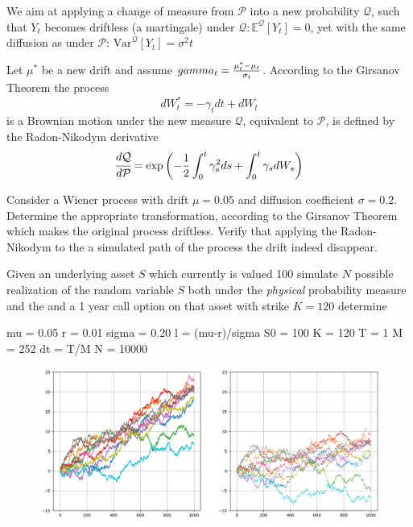 \documentclass[12pt,a4paper]{book}
\begin{document}
\begin{question}[subtitle=Drifty Brownian Motion]
We aim at applying a change of measure from $\mathcal{P}$ into a new probability $\mathcal{Q}$, such that $Y_t$ becomes driftless (a martingale) under $\mathcal{Q}: \mathbb{E}^{\mathcal{Q}}[Y_t]=0$, yet with the same diffusion as under $\mathcal{P}$: $\text{Var}^{\mathcal{Q}}[Y_t]=\sigma^2 t$

Let $\mu^{*}$ be a new drift and assume $\\gamma_t = \frac{\mu_t^{*}-\mu_t}{\sigma_t}$. According to the Girsanov Theorem the process
\begin{equation}
dW^{*}_t = -\gamma_t dt + dW_t
\end{equation}
is a Brownian motion under the new measure $\mathcal{Q}$, equivalent to $\mathcal{P}$, is defined by the Radon-Nikodym derivative
\begin{equation}
\cfrac{d\mathcal{Q}}{d\mathcal{P}} = \exp\left(-\frac{1}{2}\int_0^t\gamma_s^2 ds + \int_0^t\gamma_s dW_s\right)
\end{equation}
\end{question}

\begin{question}
Consider a Wiener process with drift $\mu=0.05$ and diffusion coefficient $\sigma=0.2$. Determine the appropriate transformation, according to the Girsanov Theorem which makes the original process driftless. Verify that applying the Radon-Nikodym to the a simulated path of the process the drift indeed disappear.

\end{question}

\begin{question}
Given an underlying asset $S$ which currently is valued 100 simulate $N$ possible realization of the random variable $S$ both under the \emph{physical} probability measure and the 
and a 1 year call option on that asset with strike $K=120$ determine 


mu = 0.05
r = 0.01
sigma = 0.20
l = (mu-r)/sigma
S0 = 100
K = 120
T = 1
M = 252
dt = T/M
N = 10000
\begin{figure}[htbp]
	\begin{center}
		\includegraphics[width=0.5\linewidth]{addons/brownian_motion_girsanov}
	\end{center}
	\label{fig:brownian_motion_girsanov}
\end{figure}
\end{question}
\clearpage
\end{document}
